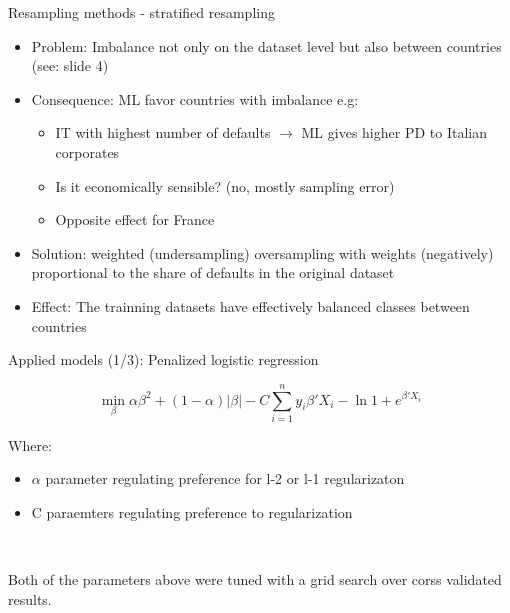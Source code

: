 \documentclass{beamer}
\begin{document}
\begin{frame}{Resampling methods - stratified resampling}

\begin{itemize}
\item Problem: Imbalance not only on the dataset level but also between countries (see: slide 4)
\item Consequence: ML favor countries with imbalance e.g:

\begin{itemize}
	\item IT with highest number of defaults $\rightarrow$ ML gives higher PD to Italian corporates
	\item Is it economically sensible? (no, mostly sampling error)
	\item Opposite effect for France
\end{itemize}

\item Solution: weighted (undersampling) oversampling with weights (negatively) proportional to the share of defaults in the original dataset
\item Effect: The trainning datasets have effectively balanced classes between countries
\end{itemize}
\end{frame}


\begin{frame}{Applied models (1/3): Penalized logistic regression}


$$\min_{\beta} \alpha \beta^2 + (1-\alpha)|\beta| - C \sum_{i = 1}^n y_i \beta ' X_i - \ln 1 + e^{\beta'X_i}$$

Where:

\begin{itemize}
\item $\alpha$ parameter regulating preference for l-2 or l-1 regularizaton
\item C paraemters regulating preference to regularization
\end{itemize}

\

Both of the parameters above were tuned with a grid search over corss validated results.


\end{frame}
\end{document}
